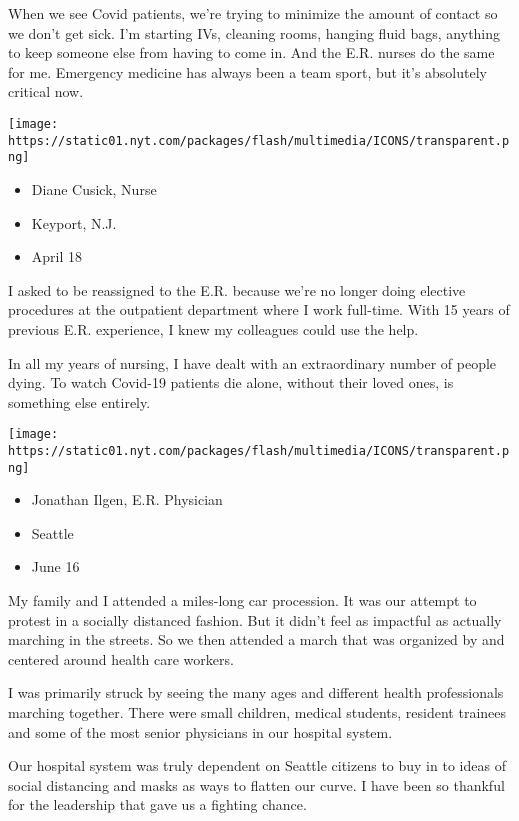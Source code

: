 When we see Covid patients, we're trying to minimize the amount of
contact so we don't get sick. I'm starting IVs, cleaning rooms, hanging
fluid bags, anything to keep someone else from having to come in. And
the E.R. nurses do the same for me. Emergency medicine has always been a
team sport, but it's absolutely critical now.

\texttt{[image: https://static01.nyt.com/packages/flash/multimedia/ICONS/transparent.png]}

\begin{itemize}
\tightlist
\item
  Diane Cusick, Nurse
\item
  Keyport, N.J.
\item
  April 18
\end{itemize}

I asked to be reassigned to the E.R. because we're no longer doing
elective procedures at the outpatient department where I work full-time.
With 15 years of previous E.R. experience, I knew my colleagues could
use the help.

In all my years of nursing, I have dealt with an extraordinary number of
people dying. To watch Covid-19 patients die alone, without their loved
ones, is something else entirely.

\texttt{[image: https://static01.nyt.com/packages/flash/multimedia/ICONS/transparent.png]}

\begin{itemize}
\tightlist
\item
  Jonathan Ilgen, E.R. Physician
\item
  Seattle
\item
  June 16
\end{itemize}

My family and I attended a miles-long car procession. It was our attempt
to protest in a socially distanced fashion. But it didn't feel as
impactful as actually marching in the streets. So we then attended a
march that was organized by and centered around health care workers.

I was primarily struck by seeing the many ages and different health
professionals marching together. There were small children, medical
students, resident trainees and some of the most senior physicians in
our hospital system.

Our hospital system was truly dependent on Seattle citizens to buy in to
ideas of social distancing and masks as ways to flatten our curve. I
have been so thankful for the leadership that gave us a fighting chance.

